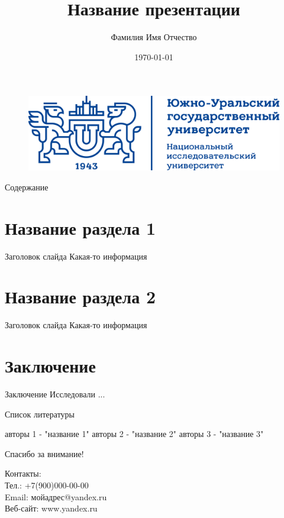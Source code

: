 \documentclass{beamer}
\author{Фамилия Имя Отчество}
\title{Название презентации}
\institute{ФГАОУ ВО "ЮУрГУ (НИУ)"}
\date{\today}
\begin{document}
	
\begin{frame}
	\titlepage
	\begin{figure}[htpb]
		\begin{center}
		\includegraphics[width=0.5\linewidth]{SUSUlogo}
		\end{center}
	\end{figure}
\end{frame}

\begin{frame} {Содержание}
		\tableofcontents[sectionstyle=show,subsectionstyle=show/shaded/hide,subsubsectionstyle=show/shaded/hide]
\end{frame}

\section{Название раздела 1}
    \begin{frame}{Заголовок слайда}
    	Какая-то информация
    \end{frame}

\section{Название раздела 2}
     \begin{frame}{Заголовок слайда}
     	Какая-то информация
     \end{frame}
 
 \section{Заключение}
 \begin{frame}{Заключение}
 	Исследовали ...
 \end{frame}

\begin{frame}{Список литературы}
	\begin{thebibliography}{}
		  авторы 1  -  "название 1"
		  авторы 2  -  "название 2"
		  авторы 3  -  "название 3"
	\end{thebibliography}
\end{frame}

\begin{frame}\centering
	{\Huge Спасибо за внимание! \par}
	\bigbreak
	{\large  Контакты: \\ Тел.: +7(900)000-00-00 \\ Email: мойадрес@yandex.ru \\ Веб-сайт: www.yandex.ru \par}
\end{frame}
\end{document}
